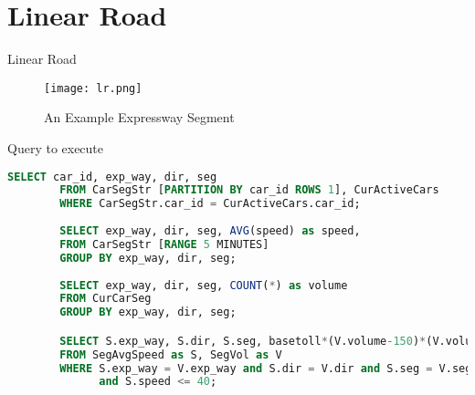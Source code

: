 \section{Linear Road}
\frame{\sectionpage}

\begin{frame}{Linear Road}
    \begin{figure}
        \centering
        \texttt{[image: lr.png]}\\
        \caption{An Example Expressway Segment}
        \label{fig:lr_ex}
    \end{figure}
\end{frame}

\begin{frame}[fragile]{Query to execute}
    \begin{lstlisting}[language=SQL, caption= SEGTOLL linear road query]
        SELECT car_id, exp_way, dir, seg
        FROM CarSegStr [PARTITION BY car_id ROWS 1], CurActiveCars
        WHERE CarSegStr.car_id = CurActiveCars.car_id;
        
        SELECT exp_way, dir, seg, AVG(speed) as speed,
        FROM CarSegStr [RANGE 5 MINUTES]
        GROUP BY exp_way, dir, seg;
        
        SELECT exp_way, dir, seg, COUNT(*) as volume
        FROM CurCarSeg
        GROUP BY exp_way, dir, seg;

        SELECT S.exp_way, S.dir, S.seg, basetoll*(V.volume-150)*(V.volume-150)
        FROM SegAvgSpeed as S, SegVol as V
        WHERE S.exp_way = V.exp_way and S.dir = V.dir and S.seg = V.seg
              and S.speed <= 40;
    \end{lstlisting}
\end{frame}
